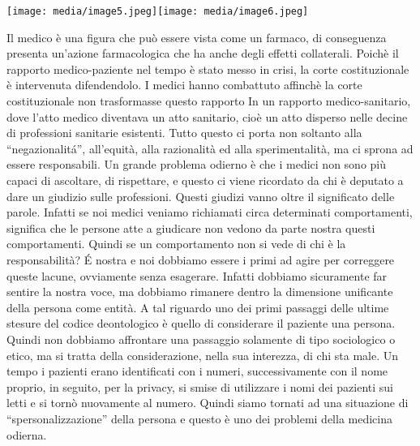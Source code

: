 \documentclass[]{article}
\begin{document}
\texttt{[image: media/image5.jpeg]}\texttt{[image: media/image6.jpeg]}

Il medico è una figura che può essere vista come un farmaco, di
conseguenza presenta un'azione farmacologica che ha anche degli effetti
collaterali. Poichè il rapporto medico-paziente nel tempo è stato messo
in crisi, la corte costituzionale è intervenuta difendendolo. I medici
hanno combattuto affinchè la corte costituzionale non trasformasse
questo rapporto In un rapporto medico-sanitario, dove l'atto medico
diventava un atto sanitario, cioè un atto disperso nelle decine di
professioni sanitarie esistenti. Tutto questo ci porta non soltanto alla
``negazionalitá'', all'equità, alla razionalità ed alla sperimentalità,
ma ci sprona ad essere responsabili. Un grande problema odierno è che i
medici non sono più capaci di ascoltare, di rispettare, e questo ci
viene ricordato da chi è deputato a dare un giudizio sulle professioni.
Questi giudizi vanno oltre il significato delle parole. Infatti se noi
medici veniamo richiamati circa determinati comportamenti, significa che
le persone atte a giudicare non vedono da parte nostra questi
comportamenti. Quindi se un comportamento non si vede di chi è la
responsabilità? É nostra e noi dobbiamo essere i primi ad agire per
correggere queste lacune, ovviamente senza esagerare. Infatti dobbiamo
sicuramente far sentire la nostra voce, ma dobbiamo rimanere dentro la
dimensione unificante della persona come entità. A tal riguardo uno dei
primi passaggi delle ultime stesure del codice deontologico è quello di
considerare il paziente una persona. Quindi non dobbiamo affrontare una
passaggio solamente di tipo sociologico o etico, ma si tratta della
considerazione, nella sua interezza, di chi sta male. Un tempo i
pazienti erano identificati con i numeri, successivamente con il nome
proprio, in seguito, per la privacy, si smise di utilizzare i nomi dei
pazienti sui letti e si tornò nuovamente al numero. Quindi siamo tornati
ad una situazione di ``spersonalizzazione'' della persona e questo è uno
dei problemi della medicina odierna.
\end{document}
